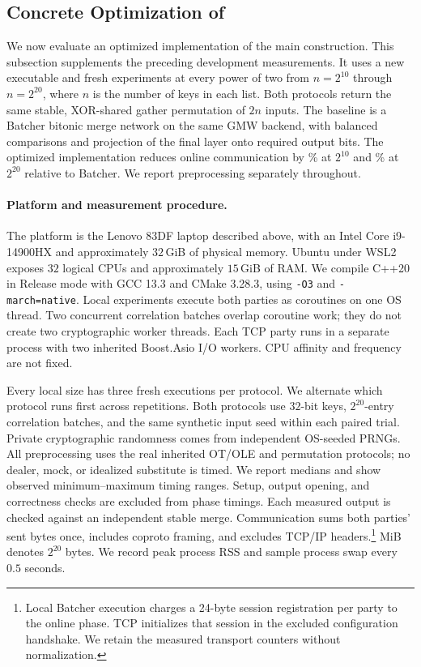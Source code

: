 \subsection{Concrete Optimization of \ourprotocol}\label{sec:packed-eval}


We now evaluate an optimized implementation of the main construction.
This subsection supplements the preceding development measurements.
It uses a new executable and fresh experiments at every power of two from
$n=2^{10}$ through $n=2^{20}$, where $n$ is the number of keys in each list.
Both protocols return the same stable, XOR-shared gather permutation of $2n$
inputs. The baseline is a Batcher bitonic merge network on the same GMW backend,
with balanced comparisons and projection of the final layer onto required output bits.
The optimized implementation reduces online communication by
\packedSmallReduction\% at $2^{10}$ and \packedLargeReduction\% at $2^{20}$
relative to Batcher. We report preprocessing separately throughout.

\paragraph{Platform and measurement procedure.}
The platform is the Lenovo 83DF laptop described above, with an Intel Core
i9-14900HX and approximately $32$\,GiB of physical memory.
Ubuntu under WSL2 exposes $32$ logical CPUs and approximately $15$\,GiB of RAM.
We compile C++20 in Release mode with GCC 13.3 and CMake 3.28.3,
using \texttt{-O3} and \texttt{-march=native}.
Local experiments execute both parties as coroutines on one OS thread.
Two concurrent correlation batches overlap coroutine work; they do not create
two cryptographic worker threads. Each TCP party runs in a separate process
with two inherited Boost.Asio I/O workers. CPU affinity and frequency are not fixed.

Every local size has three fresh executions per protocol. We alternate which
protocol runs first across repetitions. Both protocols use $32$-bit keys,
$2^{20}$-entry correlation batches, and the same synthetic input seed within
each paired trial. Private cryptographic randomness comes from independent
OS-seeded PRNGs. All preprocessing uses the real inherited OT/OLE and permutation
protocols; no dealer, mock, or idealized substitute is timed.
We report medians and show observed minimum--maximum timing ranges.
Setup, output opening, and correctness checks are excluded from phase timings.
Each measured output is checked against an independent stable merge.
Communication sums both parties' sent bytes once, includes coproto framing,
and excludes TCP/IP headers.\footnote{Local Batcher execution charges a
24-byte session registration per party to the online phase. TCP initializes
that session in the excluded configuration handshake. We retain the measured
transport counters without normalization.} MiB denotes $2^{20}$ bytes.
We record peak process RSS and sample process swap every $0.5$ seconds.

